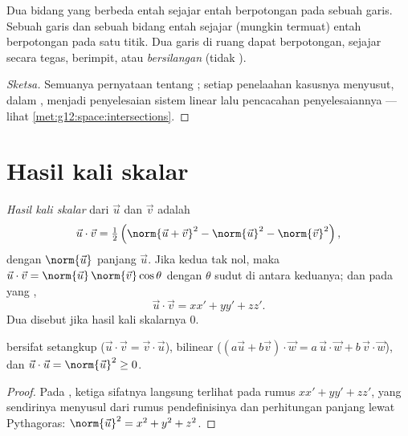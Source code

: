 \begin{proposition}\label{prop:g12:space:positions}
Dua bidang yang berbeda entah sejajar entah berpotongan pada sebuah garis. Sebuah
garis dan sebuah bidang entah sejajar (mungkin termuat) entah berpotongan pada satu
titik. Dua garis di ruang dapat berpotongan, sejajar secara tegas, berimpit,
atau \emph{bersilangan} (tidak ).
\end{proposition}

\begin{proof}[Sketsa]
Semuanya pernyataan tentang ; setiap penelaahan kasusnya menyusut, dalam
, menjadi penyelesaian sistem linear lalu pencacahan penyelesaiannya --- lihat
\cref{met:g12:space:intersections}.
\end{proof}

\section{Hasil kali skalar}

\begin{definition}\label{def:g12:space:dot}
\emph{Hasil kali skalar} dari $\vec u$ dan $\vec v$ adalah
\[
\vec u \cdot \vec v = \tfrac12\left(\norm{\vec u + \vec v}^2
- \norm{\vec u}^2 - \norm{\vec v}^2\right),
\]
dengan $\norm{\vec u}$ panjang $\vec u$. Jika kedua 
tak nol, maka $\vec u \cdot \vec v = \norm{\vec u}\,\norm{\vec v}\cos\theta$
dengan $\theta$ sudut di antara keduanya; dan pada  yang
\emph{},
\[
\vec u \cdot \vec v = xx' + yy' + zz' .
\]
Dua  disebut \emph{} jika hasil kali skalarnya $0$.
\end{definition}

\begin{proposition}[Sifatnya]\label{prop:g12:space:dotprops}
 bersifat setangkup ($\vec u\cdot\vec v = \vec v\cdot\vec u$),
bilinear ($(a\vec u + b\vec v)\cdot \vec w = a\,\vec u\cdot\vec w +
b\,\vec v\cdot \vec w$), dan
$\vec u \cdot \vec u = \norm{\vec u}^2 \geq 0$.
\end{proposition}

\begin{proof}
Pada , ketiga sifatnya langsung terlihat pada rumus
$xx' + yy' + zz'$, yang sendirinya menyusul dari rumus pendefinisinya dan
perhitungan panjang lewat Pythagoras:
$\norm{\vec u}^2 = x^2 + y^2 + z^2$.
\end{proof}

